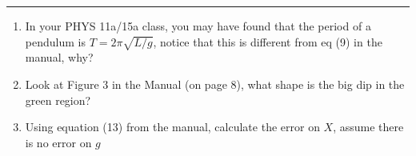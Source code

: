 \documentclass[11pt]{article}
\begin{document}
\Large

\medskip\hrule\bigskip\bigskip
{}
\begin{enumerate}

\item In your PHYS 11a/15a class, you may have found that the period of a pendulum is $T=2\pi\sqrt{L/g}$, notice that this is different from eq (9) in the manual, why? 
  \vspace*{0.1\textheight}
\item Look at Figure 3 in the Manual (on page 8), what shape is the big dip in the green region?
  \vspace*{0.1\textheight}
\item Using equation (13) from the manual, calculate the error on $X$, assume there is no error on $g$
  
\end{enumerate}
\end{document}
